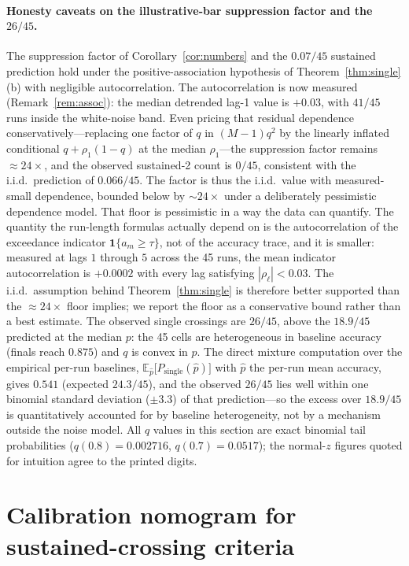 \documentclass[11pt]{article}
\theoremstyle{plain}
\theoremstyle{definition}
\begin{document}
\paragraph{Honesty caveats on the illustrative-bar suppression factor and the $26/45$.}
The suppression factor of Corollary~\ref{cor:numbers} and the $0.07/45$ sustained prediction hold under the
positive-association hypothesis of Theorem~\ref{thm:single}(b) with negligible
autocorrelation. The autocorrelation is now measured (Remark~\ref{rem:assoc}): the median
detrended lag-1 value is $+0.03$, with $41/45$ runs inside the white-noise band. Even
pricing that residual dependence conservatively---replacing one factor of $q$ in
$(M-1)q^{2}$ by the linearly inflated conditional $q+\rho_{1}(1-q)$ at the median
$\rho_{1}$---the suppression factor remains ${\approx}24\times$, and the observed sustained-2
count is $0/45$, consistent with the i.i.d.\ prediction of $0.066/45$. The factor is
thus the i.i.d.\ value with measured-small dependence, bounded below by ${\sim}24\times$
under a deliberately pessimistic dependence model.
That floor is pessimistic in a way the data can quantify. The quantity the run-length
formulas actually depend on is the autocorrelation of the exceedance indicator
$\mathbf{1}\{a_{m}\geq\tau\}$, not of the accuracy trace, and it is smaller: measured at
lags $1$ through $5$ across the 45 runs, the mean indicator autocorrelation is $+0.0002$
with every lag satisfying $|\rho_{\ell}|<0.03$. The i.i.d.\ assumption behind
Theorem~\ref{thm:single} is therefore better supported than the ${\approx}24\times$ floor
implies; we report the floor as a conservative bound rather than a best estimate.
The observed single crossings are $26/45$, above the $18.9/45$ predicted at the median $p$:
the 45 cells are heterogeneous in baseline accuracy (finals reach $0.875$) and $q$ is convex
in $p$. The direct mixture computation over the empirical per-run baselines,
$\mathbb{E}_{\hat p}\bigl[P_{\mathrm{single}}(\hat p)\bigr]$ with $\hat p$ the per-run mean
accuracy, gives $0.541$ (expected $24.3/45$), and the observed $26/45$ lies well within one
binomial standard deviation ($\pm3.3$) of that prediction---so the excess over $18.9/45$ is
quantitatively accounted for by baseline heterogeneity, not by a mechanism outside the noise
model. All $q$ values in this section are exact binomial tail probabilities
($q(0.8)=0.002716$, $q(0.7)=0.0517$); the normal-$z$ figures quoted for intuition agree to
the printed digits.


\section{Calibration nomogram for sustained-crossing criteria}\label{sec:nomogram}
\end{document}
